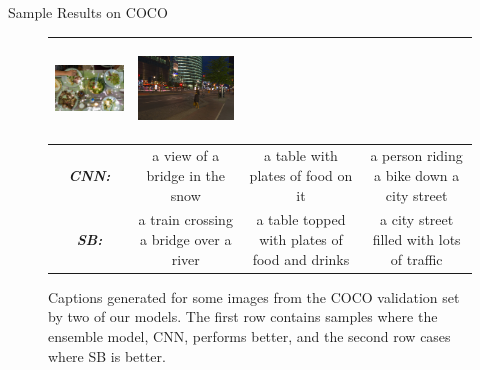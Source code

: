\documentclass{beamer}
\newcommand{\mcCell}[1]{\multicolumn{1}{|c|}{#1}}
\begin{document}
\begin{frame}{Sample Results on COCO}
\begin{figure}[h]
\begin{center}
{\begin{tabular}{c|c|c|c|}
    \includegraphics[width=0.25\linewidth,height=2.5cm]{images/COCO_val2014_000000218404.jpg} &
    \includegraphics[width=0.25\linewidth,height=2.5cm]{images/COCO_val2014_000000119516.jpg} \\\hline
    \mcCell{\textbf{\em\scriptsize CNN:}}& \parbox[c][][c]{0.25\linewidth}{\smallskip \scriptsize a view of a bridge in the snow\smallskip} &
     \parbox[c][][c]{0.25\linewidth}{\smallskip \scriptsize a table with plates of food on it\smallskip}&
     \parbox[c][][c]{0.25\linewidth}{\smallskip \scriptsize a person riding a bike down a city street\smallskip}\\\hline
     \mcCell{\textbf{\em\scriptsize SB:}}& \parbox[c][][c]{0.25\linewidth}{\smallskip \scriptsize a train crossing a bridge over a river\smallskip} &
     \parbox[c][][c]{0.25\linewidth}{\smallskip \scriptsize a table topped with plates of food and drinks\smallskip}&
     \parbox[c][][c]{0.25\linewidth}{\smallskip \scriptsize a city street filled with lots of traffic\smallskip}\\\hline
  \end{tabular}
  }
  \end{center}
  \caption{Captions generated for some images from the COCO validation set by two of our
    models. The first row contains samples where the ensemble model,
    CNN,  performs better, and the second row cases where SB is
    better.}
  \label{fig:cococapSamps}
\end{figure}

\end{frame}
\end{document}
